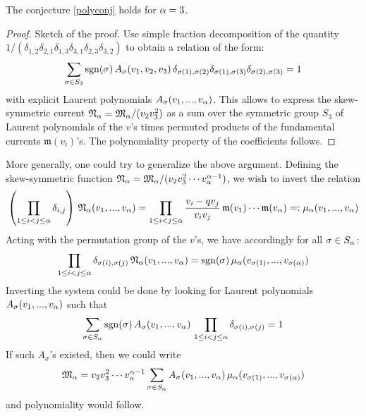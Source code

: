\begin{thm}\label{polthree}
The conjecture \ref{polyconj} holds for ${\alpha}=3$.
\end{thm}
\begin{proof}
Sketch of the proof. Use simple fraction decomposition of the quantity
$1/(\delta_{1,2}\delta_{2,1}\delta_{1,3}\delta_{3,1}\delta_{2,3}\delta_{3,2})$ to obtain a relation of the form:
$$\sum_{\sigma\in S_3} {\rm sgn}(\sigma)\,A_\sigma(v_1,v_2,v_3) \, 
\delta_{\sigma(1),\sigma(2)}\delta_{\sigma(1),\sigma(3)}\delta_{\sigma(2),\sigma(3)}=1$$
with explicit Laurent polynomials $A_\sigma(v_1,...,v_{\alpha})$. This allows to express the skew-symmetric 
current ${\mathfrak N}_{\alpha}={\mathfrak M}_{\alpha}/(v_2 v_3^2)$ as a sum over the symmetric group $S_3$ 
of Laurent polynomials of the $v$'s times permuted products of the fundamental currents 
${\mathfrak m}(v_i)$'s. The polynomiality property of the coefficients follows.
\end{proof}


More generally, one could try to generalize the above argument. Defining the skew-symmetric function
${\mathfrak N}_{\alpha}={\mathfrak M}_{\alpha}/(v_2 v_3^2\cdots v_{\alpha}^{{\alpha}-1})$, we wish to invert the relation
$$\left(\prod_{1\leq i<j\leq {\alpha}} \delta_{i,j} \right)\, {\mathfrak N}_{\alpha}(v_1,...,v_{\alpha})
=\prod_{1\leq i<j\leq {\alpha}}\frac{v_i-q v_j}{v_i v _j}\,
{\mathfrak m}(v_1)\cdots {\mathfrak m}(v_{\alpha})
=:\mu_{\alpha}(v_1,...,v_{\alpha})$$
Acting with the permutation group of the $v$'s, we have accordingly for all $\sigma \in S_{\alpha}$:
$$\prod_{1\leq i<j\leq {\alpha}} \delta_{\sigma(i),\sigma(j)} \, {\mathfrak N}_{\alpha}(v_1,...,v_{\alpha})
={\rm sgn}(\sigma)\, \mu_{\alpha}(v_{\sigma(1)},...,v_{\sigma({\alpha})})$$
Inverting the system could be done by looking for Laurent polynomials $A_\sigma(v_1,...,v_{\alpha})$ such that
$$\sum_{\sigma\in S_{\alpha}} {\rm sgn}(\sigma)\,A_\sigma(v_1,...,v_{\alpha}) \,\prod_{1\leq i<j\leq {\alpha}} \delta_{\sigma(i),\sigma(j)}=1$$
If such $A_\sigma$'s existed, then we could write
$${\mathfrak M}_{\alpha}=v_2 v_3^2\cdots v_{\alpha}^{{\alpha}-1}\sum_{\sigma\in S_{\alpha}} 
A_\sigma(v_1,...,v_{\alpha})  \, \mu_{\alpha}(v_{\sigma(1)},...,v_{\sigma({\alpha})})$$
and polynomiality would follow.





